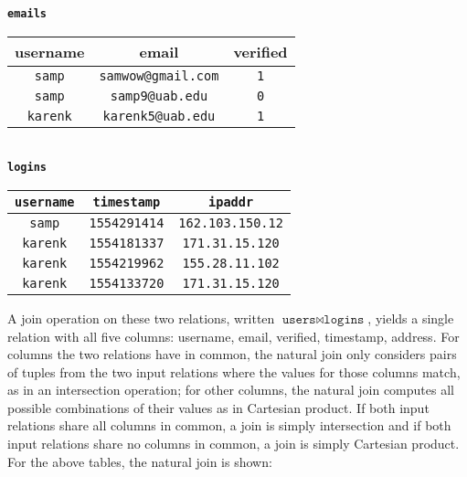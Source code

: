 \begin{center}
  \textbf{\texttt{emails}} \vspace{0.05cm} \\
  \begin{tabular}{ | c | c | c | }
    \hline
    \textbf{username} & \textbf{email} & \textbf{verified} \\
    \hline
    \texttt{samp} & \texttt{samwow@gmail.com} & \texttt{1} \\ \hline
    \texttt{samp} & \texttt{samp9@uab.edu} & \texttt{0} \\ \hline
    \texttt{karenk} & \texttt{karenk5@uab.edu} & \texttt{1} \\ \hline
  \end{tabular}
  \vspace{0.3cm} \\
  \textbf{\texttt{logins}} \vspace{0.05cm} \\
  \begin{tabular}{ | c | c | c | }
    \hline
    \textbf{\texttt{username}} & \textbf{\texttt{timestamp}} & \textbf{\texttt{ipaddr}} \\
    \hline
    \texttt{samp} & \texttt{1554291414} & \texttt{162.103.150.12} \\ \hline
    \texttt{karenk} & \texttt{1554181337} & \texttt{171.31.15.120} \\ \hline
    \texttt{karenk} & \texttt{1554219962} & \texttt{155.28.11.102} \\ \hline
    \texttt{karenk} & \texttt{1554133720} & \texttt{171.31.15.120} \\ \hline
  \end{tabular}
\end{center}

A join operation on these two relations, written $\texttt{users} \bowtie \texttt{logins}$,
yields a single relation with all five columns: username, email, verified, timestamp, address. For columns the two relations have in common, the natural join only considers pairs of tuples from the two input relations where the values for those columns match, as in an intersection operation; for other columns, the natural join computes all possible combinations of their values as in Cartesian product. If both input relations share all columns in common, a join is simply intersection and if both input relations share no columns in common, a join is simply Cartesian product. For the above tables, the natural join is shown:


